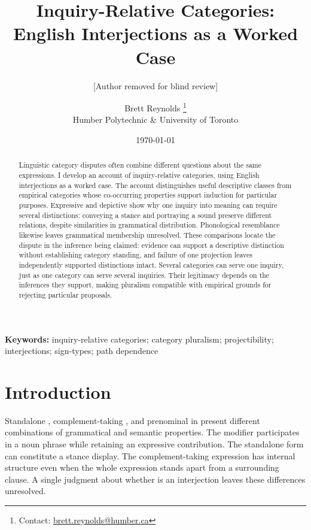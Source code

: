 \documentclass[12pt]{article}
\title{Inquiry-Relative Categories:\\English Interjections as a Worked Case}
\author{[Author removed for blind review]}
\author{Brett Reynolds \orcidlink{0000-0003-0073-7195}%
\thanks{Contact: \href{mailto:brett.reynolds@humber.ca}{brett.reynolds@humber.ca}}\\
Humber Polytechnic \& University of Toronto}
\date{\today}
\begin{document}
\maketitle

\begin{abstract}
Linguistic category disputes often combine different questions about the
same expressions. I develop an account of inquiry-relative categories,
using English interjections as a worked case. The account distinguishes
useful descriptive classes from empirical categories whose co-occurring
properties support induction for particular purposes. Expressive
 and depictive  show why one inquiry into
meaning can require several distinctions: conveying a stance and portraying
a sound preserve different relations, despite similarities in grammatical
distribution. Phonological resemblance likewise leaves grammatical
membership unresolved. These comparisons locate the dispute in the
inference being claimed: evidence can support a descriptive distinction
without establishing category standing, and failure of one projection
leaves independently supported distinctions intact. Several categories
can serve one inquiry, just as one category can serve several
inquiries. Their legitimacy depends on the inferences they support, making
pluralism compatible with empirical grounds for rejecting particular proposals.
\end{abstract}

\noindent\textbf{Keywords:} inquiry-relative categories; category pluralism;
projectibility; interjections; sign-types; path dependence


\section{Introduction}\label{sec:intro}

Standalone , complement-taking ,
and prenominal  in  present different
combinations of grammatical and semantic properties. The modifier participates
in a noun phrase while retaining an expressive contribution. The standalone
form can constitute a stance display. The complement-taking expression has
internal structure even when the whole expression stands apart from a
surrounding clause. A single judgment about whether  is an
interjection leaves these differences unresolved.
\end{document}
